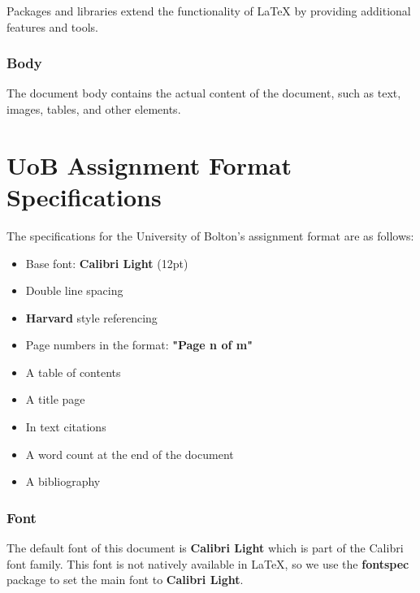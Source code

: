\documentclass[12pt]{article}
\begin{document}
  Packages and libraries extend the functionality of LaTeX by providing additional features and tools.


  \subsubsection{Body}
  \label{sec:body}

  The document body contains the actual content of the document, such as text, images, tables, and other elements.


  \section{UoB Assignment Format Specifications}
  \label{sec:uob-assignment-format-specifications}

  The specifications for the University of Bolton's assignment format are as follows:

  \begin{itemize}
    \item Base font: \textbf{Calibri Light} (12pt)
    \item Double line spacing
    \item \textbf{Harvard} style referencing
    \item Page numbers in the format: \textbf{"Page n of m"}
    \item A table of contents
    \item A title page
    \item In text citations
    \item A word count at the end of the document
    \item A bibliography
  \end{itemize}


  \subsubsection{Font}
  \label{sec:details}

  The default font of this document is \textbf{Calibri Light} which is part of the Calibri font family. 
  This font is not natively available in \LaTeX{}, so we use the \textbf{fontspec} package to set the main font to \textbf{Calibri Light}.
  
\end{document}

